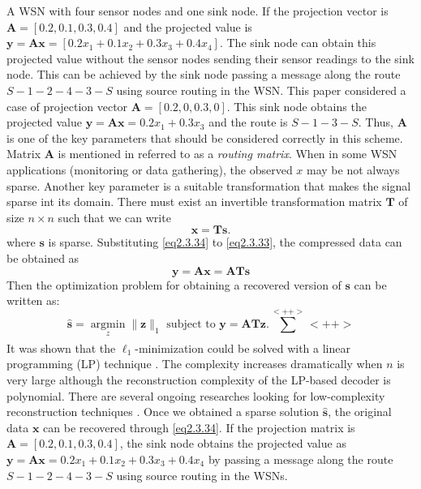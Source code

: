 A WSN with four sensor nodes and one sink node. If the projection vector is $\mathbf{A} = [0.2,0.1,0.3,0.4]$ and the projected value is $\mathbf{y} = \mathbf{Ax} = [0.2x_1+0.1x_2+0.3x_3+0.4x_4]$. The sink node can obtain this projected value without the sensor nodes sending their sensor readings to the sink node. This can be achieved by the sink node passing a message along the route $S-1-2-4-3-S$ using source routing in the WSN. This paper considered a case of projection vector $\mathbf{A} = [0.2,0,0.3,0]$. This sink node obtains the projected value $\mathbf{y} = \mathbf{Ax} = 0.2x_1+0.3x_3$ and the route is $S-1-3-S$. Thus, $\mathbf{A}$ is one of the key parameters that should be considered correctly in this scheme. Matrix $\mathbf{A}$ is mentioned in \cite{5044947} referred to as a \emph{\textcolor[rgb]{1,0,0}{routing matrix}}. When in some WSN applications (monitoring or data gathering), the observed $x$ may be not always sparse. Another key parameter is a \textcolor[rgb]{1,0,0}{suitable transformation that makes the signal sparse int its domain}. There must exist an invertible transformation matrix $\mathbf{T}$ of size $n \times n$ such that we can write
\begin{equation}
    \mathbf{x} = \mathbf{Ts}.
    \label{eq2.3.34}
\end{equation}
where $\mathbf{s}$ is sparse. Substituting \cref{eq2.3.34} to \cref{eq2.3.33}, the compressed data can be obtained as 
\begin{equation*}
    \mathbf{y} = \mathbf{Ax} = \mathbf{ATs}
\end{equation*}
Then the optimization problem for obtaining a recovered version of $\mathbf{s}$ can be written as: 
\begin{equation}
    \hat{\mathbf{s}}=\mathop{\mathrm{argmin}}\limits_z \|\mathbf{z}\|_1 \text{ subject to } \mathbf{y} = \mathbf{ATz}.
    \label{eq2.3.35}\sum_{}^{<++>}<++>
\end{equation}
It was shown that the $\ell_1$-minimization could be solved with a linear programming (LP) technique \cite{Haupt2008}. The complexity \textcolor[rgb]{0,0,1}{increases dramatically when $n$ is very large} although the reconstruction complexity of the LP-based decoder is polynomial. There are several ongoing researches looking for low-complexity reconstruction techniques \cite{Tropp2007, Blumensath2008}. Once we obtained a sparse solution $\hat{\mathbf{s}}$, the original data $\mathbf{x}$ can be recovered through \cref{eq2.3.34}. 
If the projection matrix is $\mathbf{A} = [0.2, 0.1, 0.3, 0.4]$, the sink node obtains the projected value as $\mathbf{y} = \mathbf{Ax} = 0.2x_1+0.1x_2+0.3x_3+0.4x_4$ by passing a message along the route $S-1-2-4-3-S$ using source routing in the WSNs. 


